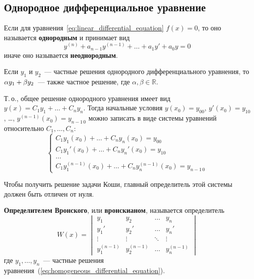 \subsection{Однородное дифференциальное уравнение}
 Если для уравнения~\ref{eq:linear_differential_equation} $f(x) = 0$, то оно называется \textbf{однородным} и принимает вид
\begin{equation}
\label{eq:homogeneous_differential_equation}
y^{(n)} + a_{n-1} y^{(n-1)} + \ldots + a_1 y' + a_0 y = 0
\end{equation}
иначе оно называется \textbf{неоднородным}.

\begin{statement}
Если $y_1$ и $y_2$~--- частные решения однородного дифференциального уравнения, то $\alpha y_1 \opbr+ \beta y_2$~--- также частное решение, где $\alpha, \beta \in \mathbb R$.
\end{statement}

Т.\,о., общее решение однородного уравнения имеет вид $y(x) = C_1 y_1 + \ldots + C_n y_n$.
Тогда начальные условия $y(x_0) = y_{00}$, $y'(x_0) = y_{10}$, \ldots, $y^{(n-1)}(x_0) = y_{n-1\,0}$ можно записать в виде системы уравнений относительно $C_1, \ldots, C_n$:
\begin{equation*}
\begin{cases}
C_1 y_1(x_0) + \ldots + C_n y_n(x_0) = y_{00} \\
C_1 y_1'(x_0) + \ldots + C_n y_n'(x_0) = y_{10} \\
\ldots \\
C_1 y_1^{(n-1)}(x_0) + \ldots + C_n y_n^{(n-1)}(x_0) = y_{n-1\,0}
\end{cases}
\end{equation*}

Чтобы получить решение задачи Коши, главный определитель этой системы должен быть отличен от нуля.

  \textbf{Определителем Вронского}, или \textbf{вронскианом}, называется определитель
\begin{equation*}
W(x) =
\begin{vmatrix}
y_1 & y_2 & \ldots & y_n \\
y_1' & y_2' & \ldots & y_n' \\
\vdots & \vdots & \ddots & \vdots \\
y_1^{(n-1)} & y_2^{(n-1)} & \ldots & y_n^{(n-1)}
\end{vmatrix}
\end{equation*}
где $y_1, \ldots, y_n$~--- частные решения уравнения~(\ref*{eq:homogeneous_differential_equation}).

